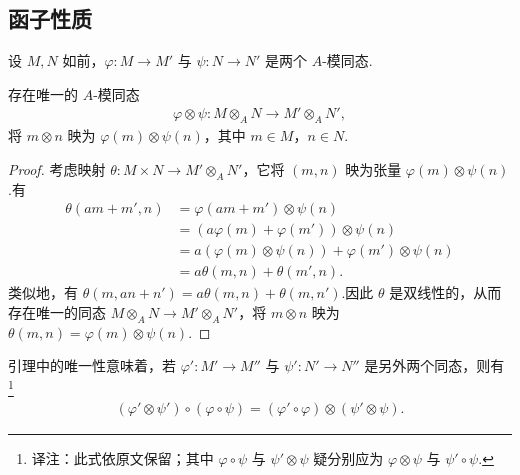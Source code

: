 \subsection{函子性质}\label{sec:galois-1-8-3}
设 $M,N$ 如前，$\varphi:M\longrightarrow M'$ 与 $\psi:N\longrightarrow N'$ 是两个 $A$-模同态.
\begin{lemma*}
存在唯一的 $A$-模同态
\begin{align*}
\varphi\otimes\psi:M\otimes_A N\longrightarrow M'\otimes_A N',
\end{align*}
将 $m\otimes n$ 映为 $\varphi(m)\otimes\psi(n)$，其中 $m\in M$，$n\in N$.
\end{lemma*}
\begin{proof}
考虑映射 $\theta:M\times N\longrightarrow M'\otimes_A N'$，它将 $(m,n)$ 映为张量 $\varphi(m)\otimes\psi(n)$.有
\begin{align*}
\theta(am+m',n)&=\varphi(am+m')\otimes\psi(n)\\
&=(a\varphi(m)+\varphi(m'))\otimes\psi(n)\\
&=a(\varphi(m)\otimes\psi(n))+\varphi(m')\otimes\psi(n)\\
&=a\theta(m,n)+\theta(m',n).
\end{align*}
类似地，有 $\theta(m,an+n')=a\theta(m,n)+\theta(m,n')$.因此 $\theta$ 是双线性的，从而存在唯一的同态 $M\otimes_A N\longrightarrow M'\otimes_A N'$，将 $m\otimes n$ 映为 $\theta(m,n)=\varphi(m)\otimes\psi(n)$.
\end{proof}
\begin{remark*}
引理中的唯一性意味着，若 $\varphi':M'\longrightarrow M''$ 与 $\psi':N'\longrightarrow N''$ 是另外两个同态，则有
\footnote{译注：此式依原文保留；其中 $\varphi\circ\psi$ 与 $\psi'\otimes\psi$ 疑分别应为 $\varphi\otimes\psi$ 与 $\psi'\circ\psi$.}
\begin{align*}
(\varphi'\otimes\psi')\circ(\varphi\circ\psi)=(\varphi'\circ\varphi)\otimes(\psi'\otimes\psi).
\end{align*}
\end{remark*}


